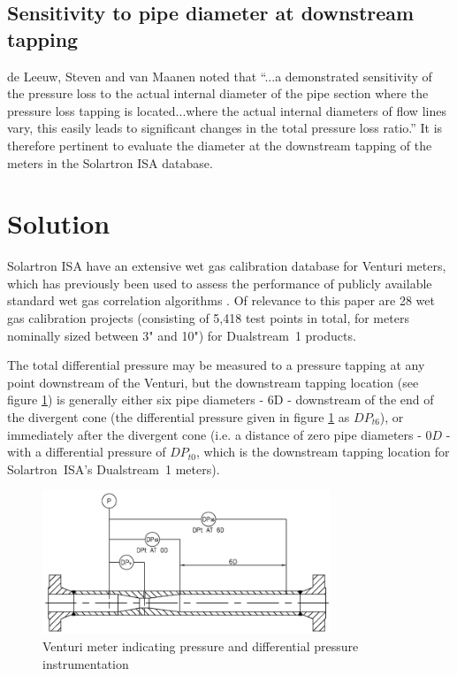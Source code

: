 \documentclass[journal]{IEEEtran}
\begin{document}
\subsection{Sensitivity to pipe diameter at downstream tapping}
de Leeuw, Steven and van Maanen noted that ``...a demonstrated sensitivity of the pressure loss to the actual internal diameter of the pipe section where the pressure loss tapping is located...where the actual internal diameters of flow lines vary, this easily leads to significant changes in the total pressure loss ratio.''  It is therefore pertinent to evaluate the diameter at the downstream tapping of the meters in the Solartron ISA database. 

\section{Solution}

Solartron ISA have an extensive wet gas calibration database for Venturi meters, which has previously been used to assess the performance of publicly available standard wet gas correlation algorithms \cite{Collins2015}.  Of relevance to this paper are 28 wet gas calibration projects (consisting of 5,418 test points in total, for meters nominally sized between 3" and 10") for Dualstream~1 products.

The total differential pressure may be measured to a pressure tapping at any point downstream of the Venturi, but the downstream tapping location (see figure \ref{fig:Venturi}) is generally either six pipe diameters - $6$\acrshort{D} - downstream of the end of the divergent cone (the differential pressure given in figure \ref{fig:Venturi} as $DP_{t6}$), or immediately after the divergent cone (i.e. a distance of zero pipe diameters - $0D$ - with a differential pressure of $DP_{t0}$, which is the downstream tapping location for Solartron~ISA's Dualstream~1 meters).

\begin{figure}[ht]
\centering
\includegraphics[width=3.4in]{Venturi.png}
\caption[]{ Venturi meter indicating pressure and differential pressure\\instrumentation }
\label{fig:Venturi}
\end{figure}
\end{document}
